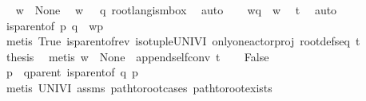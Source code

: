 \begin{isabellebody}
\ \isamarkupfalse%
\ {\isachardoublequoteopen}w\ {\isasymin}\ {\isasymT}\isactrlbsub None\isactrlesub {\isachardoublequoteclose}\ \isamarkupfalse%
\ {\isacartoucheopen}w\ {\isasymin}\ {\isasymL}\ q{\isacartoucheclose}\ root{\isacharunderscore}{\kern0pt}lang{\isacharunderscore}{\kern0pt}is{\isacharunderscore}{\kern0pt}mbox\ \isamarkupfalse%
\ auto\isanewline
\ \ \isamarkupfalse%
\ {\isachardoublequoteopen}w{\isasymdown}\isactrlsub q\ {\isacharequal}{\kern0pt}\ w{\isachardoublequoteclose}\ \isamarkupfalse%
\ t{}\ \isamarkupfalse%
\ auto\isanewline
\ \ \isamarkupfalse%
\ \isamarkupfalse%
\ {\isachardoublequoteopen}{\isacharparenleft}{\kern0pt}is{\isacharunderscore}{\kern0pt}parent{\isacharunderscore}{\kern0pt}of\ p\ q\ {\isasymlongrightarrow}\ w{\isasymdown}\isactrlsub p\ {\isacharequal}{\kern0pt}\ {\isasymepsilon}{\isacharparenright}{\kern0pt}{\isachardoublequoteclose}\ \isamarkupfalse%
\ {\isacharparenleft}{\kern0pt}metis\ True\ is{\isacharunderscore}{\kern0pt}parent{\isacharunderscore}{\kern0pt}of{\isacharunderscore}{\kern0pt}rev{\isacharparenleft}{\kern0pt}{}{\isacharparenright}{\kern0pt}\ iso{\isacharunderscore}{\kern0pt}tuple{\isacharunderscore}{\kern0pt}UNIV{\isacharunderscore}{\kern0pt}I\ only{\isacharunderscore}{\kern0pt}one{\isacharunderscore}{\kern0pt}actor{\isacharunderscore}{\kern0pt}proj\ root{\isacharunderscore}{\kern0pt}defs{\isacharunderscore}{\kern0pt}eq\ t{}{\isacharparenright}{\kern0pt}\isanewline
\ \ \isamarkupfalse%
\ \isamarkupfalse%
\ {\isacharquery}{\kern0pt}thesis\ \isamarkupfalse%
\ {\isacharparenleft}{\kern0pt}metis\ {\isacartoucheopen}w\ {\isasymin}\ {\isasymT}\isactrlbsub None\isactrlesub {\isacartoucheclose}\ \ append{\isacharunderscore}{\kern0pt}self{\isacharunderscore}{\kern0pt}conv{}\ t{}{\isacharparenright}{\kern0pt}\isanewline
{}\isamarkupfalse%
\isanewline
\ \ \isamarkupfalse%
\ False\ \isanewline
\ \ \isamarkupfalse%
\ \isamarkupfalse%
\ p\ \ q{\isacharunderscore}{\kern0pt}parent{\isacharcolon}{\kern0pt}\ {\isachardoublequoteopen}is{\isacharunderscore}{\kern0pt}parent{\isacharunderscore}{\kern0pt}of\ q\ p{\isachardoublequoteclose}\ \isamarkupfalse%
\ {\isacharparenleft}{\kern0pt}metis\ UNIV{\isacharunderscore}{\kern0pt}I\ assms{\isacharparenleft}{\kern0pt}{}{\isacharparenright}{\kern0pt}\ path{\isacharunderscore}{\kern0pt}to{\isacharunderscore}{\kern0pt}root{\isachardot}{\kern0pt}cases\ path{\isacharunderscore}{\kern0pt}to{\isacharunderscore}{\kern0pt}root{\isacharunderscore}{\kern0pt}exists{\isacharparenright}{\kern0pt}\isanewline

\end{isabellebody}
